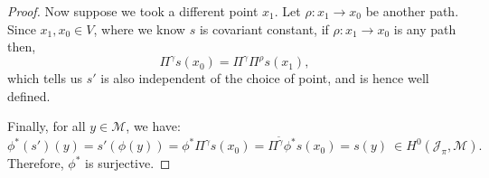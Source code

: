 \documentclass[]{article}
\newcommand{\JJ}{\mathcal{J}}
\newcommand{\MM}{\mathcal{M}}
\begin{document}
\begin{proof}
		Now suppose we took a different point $x_1$. Let $\rho:x_1\to x_0$ be another path. Since $x_1,x_0 \in V$, where we know $s$ is covariant constant, if $\rho:x_1\to x_0$ is any path then,
		\begin{equation}
		\Pi^{\gamma}s(x_0) = \Pi^{\gamma}\Pi^{\rho}s(x_1),
		\end{equation}
		which tells us $s'$ is also independent of the choice of point, and is hence well defined. 
		\smallskip
		
		Finally, for all $y\in \MM$, we have:
		\begin{equation}
			\phi^\ast (s') (y) = s'(\phi(y)) = \phi^\ast \Pi^{\gamma} s(x_0) =  \Pi^{\tilde{\gamma}} \phi^\ast s(x_0) = s(y) ~ \in H^0(\JJ_\pi,\MM).
		\end{equation}
		Therefore, $\phi^\ast$ is surjective.
		\end{proof}
\end{document}
